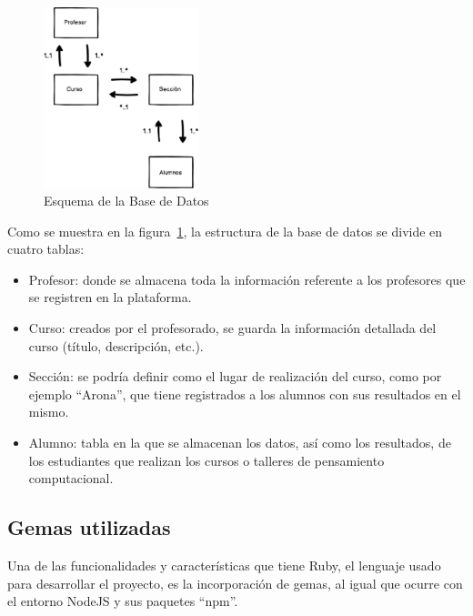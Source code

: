\begin{figure}[!th]
\begin{center}
\includegraphics[width=0.4\textwidth]{images/base_de_datos.eps}
\caption{Esquema de la Base de Datos}
\label{fig:10}
\end{center}
\end{figure}

Como se muestra en la figura~\ref{fig:10}, la estructura de la base de datos se divide en cuatro tablas:

\begin{itemize}
    \item Profesor: donde se almacena toda la información referente a los profesores que se registren en la plataforma.
    \item Curso: creados por el profesorado, se guarda la información detallada del curso (título, descripción, etc.).
    \item Sección: se podría definir como el lugar de realización del curso, como por ejemplo ``Arona'', que tiene registrados a los alumnos con sus resultados en el mismo.
    \item Alumno: tabla en la que se almacenan los datos, así como los resultados, de los estudiantes que realizan los cursos o talleres de pensamiento computacional.
\end{itemize}


\subsection{Gemas utilizadas}
\label{1:sec:2}

Una de las funcionalidades y características que tiene Ruby, el lenguaje usado para desarrollar el proyecto, es la incorporación de gemas, al igual que ocurre con el entorno NodeJS y sus paquetes ``npm''.

